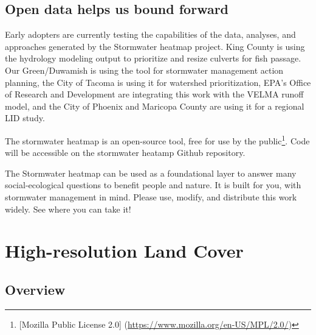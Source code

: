 \documentclass[
]{report}
\begin{document}
\hypertarget{open-data-helps-us-bound-forward}{%
\section{Open data helps us bound forward}\label{open-data-helps-us-bound-forward}}

Early adopters are currently testing the capabilities of the data, analyses, and approaches generated by the Stormwater heatmap project. King County is using the hydrology modeling output to prioritize and resize culverts for fish passage. Our Green/Duwamish is using the tool for stormwater management action planning, the City of Tacoma is using it for watershed prioritization, EPA's Office of Research and Development are integrating this work with the VELMA runoff model, and the City of Phoenix and Maricopa County are using it for a regional LID study.

The stormwater heatmap is an open-source tool, free for use by the public\footnote{{[}Mozilla Public License 2.0{]} (\url{https://www.mozilla.org/en-US/MPL/2.0/})}. Code will be accessible on the stormwater heatamp Github repository.

The Stormwater heatmap can be used as a foundational layer to answer many social-ecological questions to benefit people and nature. It is built for you, with stormwater management in mind. Please use, modify, and distribute this work widely. See where you can take it!

\hypertarget{Landcover}{%
\chapter{High-resolution Land Cover}\label{Landcover}}

\hypertarget{overview}{%
\section{Overview}\label{overview}}
\end{document}
